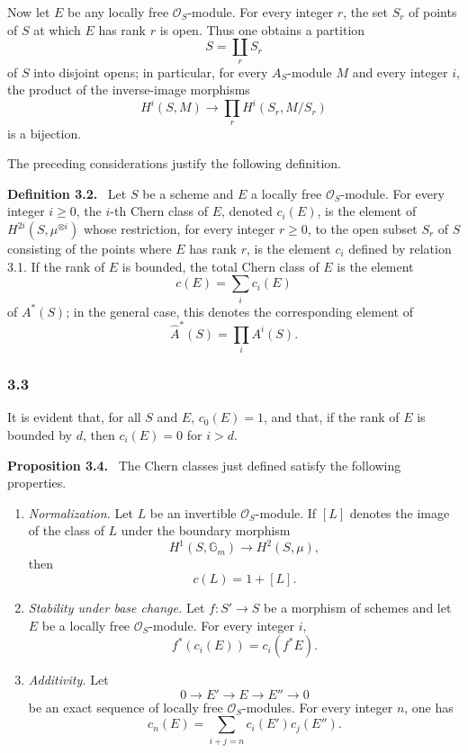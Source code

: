 \documentclass[11pt]{article}
\newenvironment{statement}[1]{\par\medskip\noindent\textbf{#1.}\ }{\par\medskip}
\begin{document}
Now let $E$ be any locally free $\mathcal O_S$-module. For every integer $r$, the set $S_r$ of points of $S$ at which $E$ has rank $r$ is open. Thus one obtains a partition
\[
S=\coprod_r S_r
\]
of $S$ into disjoint opens; in particular, for every $A_S$-module $M$ and every integer $i$, the product of the inverse-image morphisms
\[
H^i(S,M)\longrightarrow \prod_r H^i(S_r,M/S_r)
\]
is a bijection.

The preceding considerations justify the following definition.

\begin{statement}{Definition 3.2}
Let $S$ be a scheme and $E$ a locally free $\mathcal O_S$-module. For every integer $i\ge0$, the $i$-th Chern class of $E$, denoted $c_i(E)$, is the element of $H^{2i}(S,\mu^{\otimes i})$ whose restriction, for every integer $r\ge0$, to the open subset $S_r$ of $S$ consisting of the points where $E$ has rank $r$, is the element $c_i$ defined by relation 3.1. If the rank of $E$ is bounded, the total Chern class of $E$ is the element
\[
c(E)=\sum_i c_i(E)
\]
of $A^*(S)$; in the general case, this denotes the corresponding element of
\[
\widehat A^*(S)=\prod_i A^i(S).
\]
\end{statement}

\subsubsection*{3.3}
It is evident that, for all $S$ and $E$, $c_0(E)=1$, and that, if the rank of $E$ is bounded by $d$, then $c_i(E)=0$ for $i>d$.

\begin{statement}{Proposition 3.4}
The Chern classes just defined satisfy the following properties.
\begin{enumerate}[label=(\roman*)]
\item \emph{Normalization.} Let $L$ be an invertible $\mathcal O_S$-module. If $[L]$ denotes the image of the class of $L$ under the boundary morphism
\[
H^1(S,\mathbb G_m)\longrightarrow H^2(S,\mu),
\]
then
\[
c(L)=1+[L].
\]
\item \emph{Stability under base change.} Let $f:S'\to S$ be a morphism of schemes and let $E$ be a locally free $\mathcal O_S$-module. For every integer $i$,
\[
f^*(c_i(E))=c_i(f^*E).
\]
\item \emph{Additivity.} Let
\[
0\to E'\to E\to E''\to0
\]
be an exact sequence of locally free $\mathcal O_S$-modules. For every integer $n$, one has
\[
c_n(E)=\sum_{i+j=n}c_i(E')c_j(E'').
\]
\end{enumerate}
\end{statement}
\end{document}
